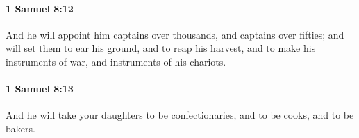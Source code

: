 		\paragraph{1 Samuel 8:12} %
			\label{1SAMUEL-8-12}

			And he will appoint him captains over thousands, and captains over fifties; and will set them to ear his ground, and to reap his harvest, and to make his instruments of war, and instruments of his chariots.


		\paragraph{1 Samuel 8:13} %
			\label{1SAMUEL-8-13}

			And he will take your daughters to be confectionaries, and to be cooks, and to be bakers.


